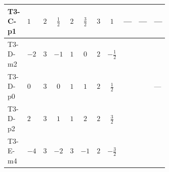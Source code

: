 \documentclass[8pt]{article}
\begin{document}
\begin{landscape}
\begin{longtable}{@{}llcccccc >{\raggedright\arraybackslash}p{0.21\linewidth} >{\raggedright\arraybackslash}p{0.21\linewidth} >{\raggedright\arraybackslash}p{0.21\linewidth}@{}}
\midrule
T3-C-p1 & $1$ & $2$ & $\frac{1}{2}$ & $2$ & $\frac{3}{2}$ & $3$ & $1$ & --- & --- & --- \\
\midrule
T3-D-m2 & $-2$ & $3$ & $-1$ & $1$ & $0$ & $2$ & $-\frac{1}{2}$ & \scriptsize\adjustbox{max width=\linewidth}{$\begin{gathered} +2 {\lambda_{S_1}^{(A)}} T_{\nu}^{(1)}\end{gathered}$} & \scriptsize\adjustbox{max width=\linewidth}{$\begin{gathered} +21 {g_2}^4\end{gathered}$} & \scriptsize\adjustbox{max width=\linewidth}{$\begin{gathered} +{g_1}^2 \left(12 {g_2}^2-12 {\lambda_{S_1}^{(1)}}-6 {\lambda_{S_1}^{(A)}}\right)\end{gathered}$} \\
\midrule
T3-D-p0 & $0$ & $3$ & $0$ & $1$ & $1$ & $2$ & $\frac{1}{2}$ & \scriptsize\adjustbox{max width=\linewidth}{$\begin{gathered} +2 {\lambda_{S_1}^{(A)}} T_{\nu}^{(1)}\end{gathered}$} & \scriptsize\adjustbox{max width=\linewidth}{$\begin{gathered} +21 {g_2}^4\end{gathered}$} & --- \\
\midrule
T3-D-p2 & $2$ & $3$ & $1$ & $1$ & $2$ & $2$ & $\frac{3}{2}$ & \scriptsize\adjustbox{max width=\linewidth}{$\begin{gathered} +2 {\lambda_{S_1}^{(A)}} T_{\nu}^{(1)}\end{gathered}$} & \scriptsize\adjustbox{max width=\linewidth}{$\begin{gathered} +21 {g_2}^4\end{gathered}$} & \scriptsize\adjustbox{max width=\linewidth}{$\begin{gathered} +{g_1}^2 \left(12 {g_2}^2-12 {\lambda_{S_1}^{(1)}}-6 {\lambda_{S_1}^{(A)}}\right)\end{gathered}$} \\
\midrule
T3-E-m4 & $-4$ & $3$ & $-2$ & $3$ & $-1$ & $2$ & $-\frac{3}{2}$ & \scriptsize\adjustbox{max width=\linewidth}{$\begin{gathered} +2 {\lambda_{S_1}^{(A)}} T_{\nu}^{(1)}\end{gathered}$} & \scriptsize\adjustbox{max width=\linewidth}{$\begin{gathered} +21 {g_2}^4\end{gathered}$} & \scriptsize\adjustbox{max width=\linewidth}{$\begin{gathered} +{g_1}^2 \left(48 {g_2}^2-48 {\lambda_{S_1}^{(1)}}-24 {\lambda_{S_1}^{(A)}}\right)\end{gathered}$} \\

\end{longtable}
\end{landscape}
\end{document}
